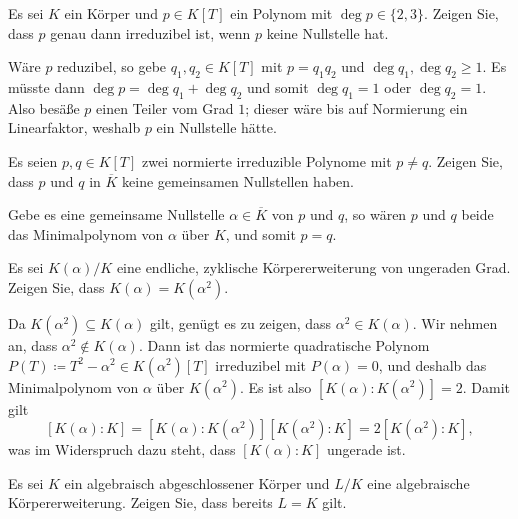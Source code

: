 \begin{question}
  Es sei $K$ ein Körper und $p \in K[T]$ ein Polynom mit $\deg p \in \{2, 3\}$.
  Zeigen Sie, dass $p$ genau dann irreduzibel ist, wenn $p$ keine Nullstelle hat.
\end{question}


\begin{solution}
  Wäre $p$ reduzibel, so gebe $q_1, q_2 \in K[T]$ mit $p = q_1 q_2$ und $\deg q_1, \deg q_2 \geq 1$.
  Es müsste dann $\deg p = \deg q_1 + \deg q_2$ und somit $\deg q_1 = 1$ oder $\deg q_2 = 1$.
  Also besäße $p$ einen Teiler vom Grad $1$;
  dieser wäre bis auf Normierung ein Linearfaktor, weshalb $p$ ein Nullstelle hätte.
\end{solution}


\begin{question}
  Es seien $p, q \in K[T]$ zwei normierte irreduzible Polynome mit $p \neq q$.
  Zeigen Sie, dass $p$ und $q$ in $\overline{K}$ keine gemeinsamen Nullstellen haben.
\end{question}


\begin{solution}
  Gebe es eine gemeinsame Nullstelle $\alpha \in \overline{K}$ von $p$ und $q$, so wären $p$ und $q$ beide das Minimalpolynom von $\alpha$ über $K$, und somit $p = q$.
\end{solution}


\begin{question}
  Es sei $K(\alpha)/K$ eine endliche, zyklische Körpererweiterung von ungeraden Grad.
  Zeigen Sie, dass $K(\alpha) = K(\alpha^2)$.
\end{question}


\begin{solution}
  Da $K(\alpha^2) \subseteq K(\alpha)$ gilt, genügt es zu zeigen, dass $\alpha^2 \in K(\alpha)$.
  Wir nehmen an, dass $\alpha^2 \notin K(\alpha)$.
  Dann ist das normierte quadratische Polynom $P(T) \coloneqq T^2 - \alpha^2 \in K(\alpha^2)[T]$ irreduzibel mit $P(\alpha) = 0$, und deshalb das Minimalpolynom von $\alpha$ über $K(\alpha^2)$.
  Es ist also $[K(\alpha) : K(\alpha^2)] = 2$.
  Damit gilt
  \[
      [K(\alpha) : K]
    = [K(\alpha) : K(\alpha^2)] [K(\alpha^2) : K]
    = 2 [K(\alpha^2) : K],
  \]
  was im Widerspruch dazu steht, dass $[K(\alpha) : K]$ ungerade ist.
\end{solution}


\begin{question}
  Es sei $K$ ein algebraisch abgeschlossener Körper und $L/K$ eine algebraische Körpererweiterung.
  Zeigen Sie, dass bereits $L = K$ gilt.
\end{question}


